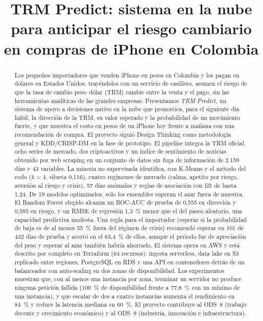 \documentclass[conference]{IEEEtran}
\begin{document}
\title{TRM Predict: sistema en la nube para anticipar el riesgo cambiario en compras de iPhone en Colombia}

\author{
}

\maketitle

\begin{abstract}
Los pequeños importadores que venden iPhone en pesos en Colombia y los pagan en dólares en Estados Unidos, trayéndolos con un servicio de casillero, asumen el riesgo de que la tasa de cambio peso--dólar (TRM) cambie entre la venta y el pago, sin las herramientas analíticas de las grandes empresas. Presentamos \emph{TRM Predict}, un sistema de apoyo a decisiones nativo en la nube que pronostica, para el siguiente día hábil, la dirección de la TRM, su valor esperado y la probabilidad de un movimiento fuerte, y que muestra el costo en pesos de un iPhone hoy frente a mañana con una recomendación de compra. El proyecto siguió Design Thinking como metodología general y KDD/CRISP-DM en la fase de prototipo. El pipeline integra la TRM oficial, ocho series de mercado, dos criptoactivos y un índice de sentimiento de noticias obtenido por web scraping en un conjunto de datos sin fuga de información de 2.159 días y 43 variables. La minería no supervisada identifica, con K-Means y el método del codo ($k=4$, silueta 0,116), cuatro regímenes de mercado (calma, apetito por riesgo, aversión al riesgo y crisis), 57 días anómalos y reglas de asociación con lift de hasta 1,24. De 19 modelos optimizados, solo los ensembles superan el azar fuera de muestra. El Random Forest elegido alcanza un ROC-AUC de prueba de 0,555 en dirección y 0,585 en riesgo, y un RMSE de regresión 1,3~\% menor que el del paseo aleatorio, una capacidad predictiva modesta. Una regla para el importador (esperar si la probabilidad de baja es de al menos 55~\% fuera del régimen de crisis) recomendó esperar en 101 de 432 días de prueba y acertó en el 63,4~\% de ellos, aunque el periodo fue de apreciación del peso y esperar al azar también habría ahorrado. El sistema opera en AWS y está descrito por completo en Terraform (64 recursos): ingesta serverless, data lake en S3 replicado entre regiones, PostgreSQL en RDS y una API en contenedores detrás de un balanceador con auto-scaling en dos zonas de disponibilidad. Los experimentos muestran que, con al menos una instancia por zona, terminar un servidor no produce ninguna petición fallida (100~\% de disponibilidad frente a 77,8~\% con un mínimo de una instancia), y que escalar de dos a cuatro instancias aumenta el rendimiento en 84~\% y reduce la latencia mediana en 60~\%. El proyecto contribuye al ODS~8 (trabajo decente y crecimiento económico) y al ODS~9 (industria, innovación e infraestructura).

\end{abstract}
\end{document}
